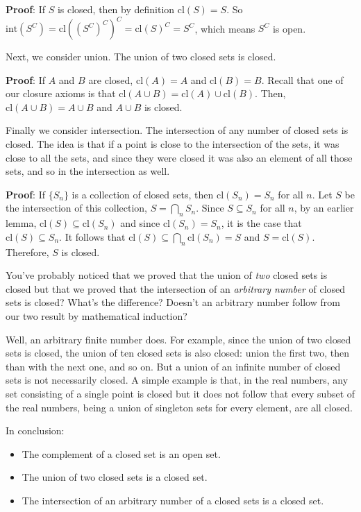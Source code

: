 \documentclass{report}
\newcommand{\cl}{\mathrm{cl}}
\newcommand{\intr}{\mathrm{int}}
\begin{document}
{\bf Proof}: If $S$ is closed, then by definition $\cl(S) = S$. So $\intr(S^C) = \cl((S^C)^C)^C = \cl(S)^C = S^C$, which means $S^C$ is open.

Next, we consider union. The union of two closed sets is closed. 

{\bf Proof}: If $A$ and $B$ are closed, $\cl(A) = A$ and $\cl(B) = B$. Recall that one of our closure axioms is that $\cl(A∪B) = \cl(A)∪\cl(B)$. Then, $\cl(A∪B) = A∪B$ and $A∪B$ is closed.

Finally we consider intersection. The intersection of any number of closed sets is closed. The idea is that if a point is close to the intersection of the sets, it was close to all the sets, and since they were closed it was also an element of all those sets, and so in the intersection as well.

{\bf Proof}: If $\{S_n\}$ is a collection of closed sets, then $\cl(S_n) = S_n$ for all $n$. Let $S$ be the intersection of this collection, $S=\bigcap_n S_n$. Since $S ⊆ S_n$ for all $n$, by an earlier lemma, $\cl(S) ⊆ \cl(S_n)$ and since $\cl(S_n) = S_n$, it is the case that $\cl(S) ⊆ S_n$. It follows that $\cl(S) ⊆ \bigcap_n \cl(S_n) = S$ and $S = \cl(S)$. Therefore, $S$ is closed.

You've probably noticed that we proved that the union of \emph{two} closed sets is closed but that we proved that the intersection of an \emph{arbitrary number} of closed sets is closed? What's the difference? Doesn't an arbitrary number follow from our two result by mathematical induction?

Well, an arbitrary finite number does. For example, since the union of two closed sets is closed, the union of ten closed sets is also closed: union the first two, then than with the next one, and so on. But a union of an infinite number of closed sets is not necessarily closed. A simple example is that, in the real numbers, any set consisting of a single point is closed but it does not follow that every subset of the real numbers, being a union of singleton sets for every element, are all closed.

In conclusion:

\begin{itemize}
\item The complement of a closed set is an open set.
\item The union of two closed sets is a closed set.
\item The intersection of an arbitrary number of a closed sets is a closed set.
\end{itemize}
\end{document}
